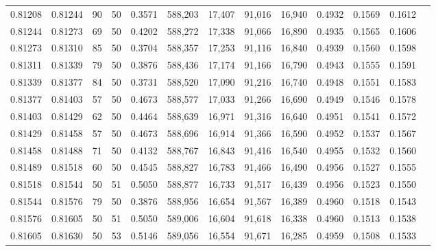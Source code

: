 \begin{tabular}{rrrrrrrrrrrrr}
0.81208 & 0.81244 &    90 &  50 &                                     0.3571 & 588,203 &  17,407 &  91,016 &  16,940 & 0.4932 & 0.1569 & 0.1612 \\
0.81244 & 0.81273 &    69 &  50 &                                     0.4202 & 588,272 &  17,338 &  91,066 &  16,890 & 0.4935 & 0.1565 & 0.1606 \\
0.81273 & 0.81310 &    85 &  50 &                                     0.3704 & 588,357 &  17,253 &  91,116 &  16,840 & 0.4939 & 0.1560 & 0.1598 \\
0.81311 & 0.81339 &    79 &  50 &                                     0.3876 & 588,436 &  17,174 &  91,166 &  16,790 & 0.4943 & 0.1555 & 0.1591 \\
0.81339 & 0.81377 &    84 &  50 &                                     0.3731 & 588,520 &  17,090 &  91,216 &  16,740 & 0.4948 & 0.1551 & 0.1583 \\
0.81377 & 0.81403 &    57 &  50 &                                     0.4673 & 588,577 &  17,033 &  91,266 &  16,690 & 0.4949 & 0.1546 & 0.1578 \\
0.81403 & 0.81429 &    62 &  50 &                                     0.4464 & 588,639 &  16,971 &  91,316 &  16,640 & 0.4951 & 0.1541 & 0.1572 \\
0.81429 & 0.81458 &    57 &  50 &                                     0.4673 & 588,696 &  16,914 &  91,366 &  16,590 & 0.4952 & 0.1537 & 0.1567 \\
0.81458 & 0.81488 &    71 &  50 &                                     0.4132 & 588,767 &  16,843 &  91,416 &  16,540 & 0.4955 & 0.1532 & 0.1560 \\
0.81489 & 0.81518 &    60 &  50 &                                     0.4545 & 588,827 &  16,783 &  91,466 &  16,490 & 0.4956 & 0.1527 & 0.1555 \\
0.81518 & 0.81544 &    50 &  51 &                                     0.5050 & 588,877 &  16,733 &  91,517 &  16,439 & 0.4956 & 0.1523 & 0.1550 \\
0.81544 & 0.81576 &    79 &  50 &                                     0.3876 & 588,956 &  16,654 &  91,567 &  16,389 & 0.4960 & 0.1518 & 0.1543 \\
0.81576 & 0.81605 &    50 &  51 &                                     0.5050 & 589,006 &  16,604 &  91,618 &  16,338 & 0.4960 & 0.1513 & 0.1538 \\
0.81605 & 0.81630 &    50 &  53 &                                     0.5146 & 589,056 &  16,554 &  91,671 &  16,285 & 0.4959 & 0.1508 & 0.1533 \\

\end{tabular}
